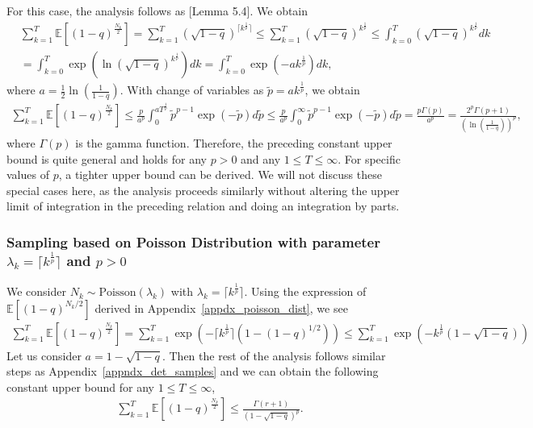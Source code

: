 \documentclass{article}
\newcommand{\EXP}[1]
{\mathbb{E}\!\left[#1\right] }
\theoremstyle{plain}
\theoremstyle{definition}
\theoremstyle{remark}
\begin{document}
For this case, the analysis follows as \cite{chakraborty2025randomized}[Lemma 5.4]. We obtain
\begin{align*}
    &\sum_{k=1}^T \EXP{(1-q)^{\frac{N_{k}}{2}}} = \sum_{k=1}^T \left( \sqrt{1-q} \right)^{\lceil k^{\frac{1}{p}} \rceil} \leq \sum_{k=1}^T \left( \sqrt{1-q} \right)^{k^{\frac{1}{p}}} \leq \int_{k=0}^{T} \left( \sqrt{1-q} \right)^{k^{\frac{1}{p}}} dk \\
    &= \int_{k=0}^{T} \exp \left( \ln \left( \sqrt{1-q} \right)^{k^{\frac{1}{p}}} \right) dk = \int_{k=0}^{T} \exp \left( - ak^{\frac{1}{p}} \right) dk ,
\end{align*}
where $a = \frac{1}{2} \ln \left( \frac{1}{1-q}\right)$. With change of variables as $\widetilde p = ak^{\frac{1}{p}}$, we obtain
\begin{align*}
    \sum_{k=1}^T \EXP{(1-q)^{\frac{N_{k}}{2}}} \leq \frac{p}{a^p} \int_{0}^{aT^{\frac{1}{p}}} \widetilde p^{p-1} \exp(- \widetilde p) d \widetilde p \leq \frac{p}{a^p} \int_{0}^\infty \widetilde p^{p-1} \exp(- \widetilde p) d \widetilde p = \frac{p \Gamma(p)}{a^p} = \frac{2^p \Gamma(p+1)}{\left( \ln \left( \frac{1}{1-q}\right) \right)^p},
\end{align*}
where $\Gamma(p)$ is the gamma function. Therefore, the preceding constant upper bound is quite general and holds for any $p > 0$ and any $1 \leq T \leq \infty$. For specific values of $p$, a tighter upper bound can be derived. We will not discuss these special cases here, as the analysis proceeds similarly without altering the upper limit of integration in the preceding relation and doing an integration by parts.


\subsubsection{Sampling based on Poisson Distribution with parameter $\lambda_k = \lceil k^{\frac{1}{p}} \rceil$ and $p > 0$}

We consider $N_k \sim \text{Poisson}(\lambda_k)$ with $\lambda_k = \lceil k^{\frac{1}{p}} \rceil$. Using the expression of $\EXP{(1 - q)^{N_k/2}}$ derived in Appendix~\ref{appdx_poisson_dist}, we see
\begin{align*}
    \sum_{k=1}^T \EXP{(1-q)^{\frac{N_{k}}{2}}} = \sum_{k=1}^T \exp{\left(-\lceil k^{\frac{1}{p}} \rceil \left(1 - (1 - q)^{1/2} \right) \right)} \leq \sum_{k=1}^T \exp{\left(- k^{\frac{1}{p}} \left(1 - \sqrt{1 - q} \right) \right)}
\end{align*}
Let us consider $a = 1 - \sqrt{1 - q}$. Then the rest of the analysis follows similar steps as Appendix~\ref{appndx_det_samples} and we can obtain the following constant upper bound for any $1 \leq T \leq \infty$,
\begin{align*}
    \sum_{k=1}^T \EXP{(1-q)^{\frac{N_{k}}{2}}} \leq \frac{\Gamma(r+1)}{\left(1 - \sqrt{1 - q} \right)^p} .
\end{align*}
\end{document}
